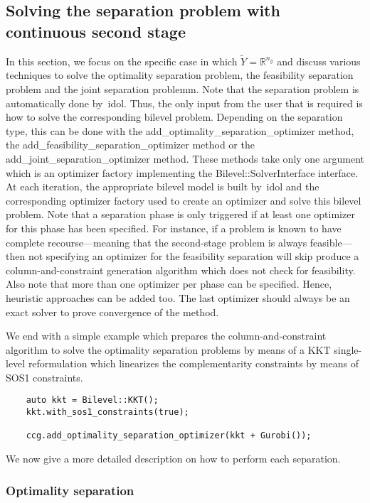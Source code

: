 \subsection{Solving the separation problem with continuous second stage}

In this section, we focus on the specific case in which $\tilde{Y} =
\mathbb{R}^{n_y}$ and discuss various techniques to solve the optimality
separation problem, the feasibility separation problem and the joint
separation problemm. Note that the separation problem is automatically done
by~\textsf{idol}. Thus, the only input from the user that is required is how
to solve the corresponding bilevel problem. Depending on the separation type,
this can be done with the \textsf{add\_optimality\_separation\_optimizer}
method, the \textsf{add\_feasibility\_separation\_optimizer} method or the
\textsf{add\_joint\_separation\_optimizer} method. These methods take only one
argument which is an optimizer factory implementing the
\textsf{Bilevel::SolverInterface} interface. At each iteration, the
appropriate bilevel model is built by~\textsf{idol} and the corresponding
optimizer factory used to create an optimizer and solve this bilevel problem.
Note that a separation phase is only triggered if at least one optimizer for
this phase has been specified. For instance, if a problem is known to have
complete recourse---meaning that the second-stage problem is always
feasible---then not specifying an optimizer for the feasibility separation
will skip produce a column-and-constraint generation algorithm which does not
check for feasibility. Also note that more than one optimizer per phase can be
specified. Hence, heuristic approaches can be added too. The last optimizer
should always be an exact solver to prove convergence of the method.

We end with a simple example which prepares the column-and-constraint
algorithm to solve the optimality separation problems by means of a KKT
single-level reformulation which linearizes the complementarity constraints by
means of SOS1 constraints.
%
\begin{lstlisting}
    auto kkt = Bilevel::KKT();
    kkt.with_sos1_constraints(true);

    ccg.add_optimality_separation_optimizer(kkt + Gurobi());
\end{lstlisting}

We now give a more detailed description on how to perform each separation. 

\subsubsection{Optimality separation}

